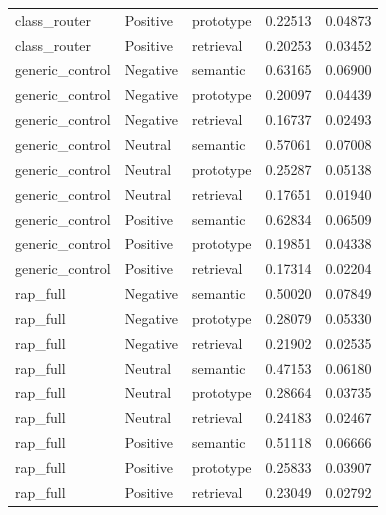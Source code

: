 \begin{tabular}{lllrr}
class_router & Positive & prototype & 0.22513 & 0.04873 \\
class_router & Positive & retrieval & 0.20253 & 0.03452 \\
generic_control & Negative & semantic & 0.63165 & 0.06900 \\
generic_control & Negative & prototype & 0.20097 & 0.04439 \\
generic_control & Negative & retrieval & 0.16737 & 0.02493 \\
generic_control & Neutral & semantic & 0.57061 & 0.07008 \\
generic_control & Neutral & prototype & 0.25287 & 0.05138 \\
generic_control & Neutral & retrieval & 0.17651 & 0.01940 \\
generic_control & Positive & semantic & 0.62834 & 0.06509 \\
generic_control & Positive & prototype & 0.19851 & 0.04338 \\
generic_control & Positive & retrieval & 0.17314 & 0.02204 \\
rap_full & Negative & semantic & 0.50020 & 0.07849 \\
rap_full & Negative & prototype & 0.28079 & 0.05330 \\
rap_full & Negative & retrieval & 0.21902 & 0.02535 \\
rap_full & Neutral & semantic & 0.47153 & 0.06180 \\
rap_full & Neutral & prototype & 0.28664 & 0.03735 \\
rap_full & Neutral & retrieval & 0.24183 & 0.02467 \\
rap_full & Positive & semantic & 0.51118 & 0.06666 \\
rap_full & Positive & prototype & 0.25833 & 0.03907 \\
rap_full & Positive & retrieval & 0.23049 & 0.02792 \\
\bottomrule
\end{tabular}
